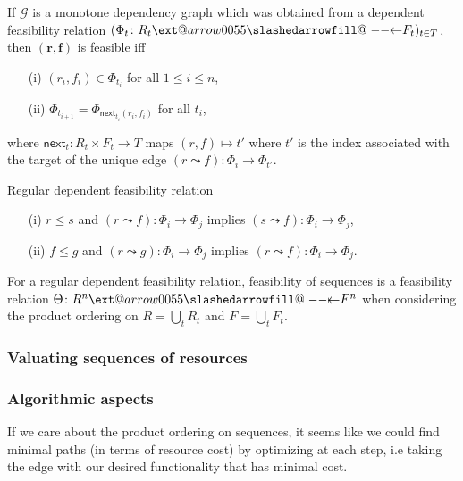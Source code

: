 \documentclass[12pt, a4paper]{article}
\makeatletter
\theoremstyle{definition}
\theoremstyle{plain}
\theoremstyle{plain}
\theoremstyle{plain}
\theoremstyle{plain}
\theoremstyle{plain}
\theoremstyle{remark}
\theoremstyle{remark}
\newcommand{\mc}[1]{\mathcal{#1}}
\def\slashedarrowfill@#1#2#3#4#5{%
	$\m@th\thickmuskip0mu\medmuskip\thickmuskip\thinmuskip\thickmuskip
	\relax#5#1\mkern-7mu%
	\cleaders\hbox{$#5\mkern-2mu#2\mkern-2mu$}\hfill
	\mathclap{#3}\mathclap{#2}%
	\cleaders\hbox{$#5\mkern-2mu#2\mkern-2mu$}\hfill
	\mkern-7mu#4$%
}
\def\leftslashedarrowfill@{%
	\slashedarrowfill@\relbar\relbar\mapstochar\leftarrow}
\newcommand\xslashedleftarrow[2][]{%
	\ext@arrow 0055{\leftslashedarrowfill@}{#1}{#2}}
\newcommand{\bprof}{\xslashedleftarrow{}}
\makeatother
\begin{document}
\begin{tctheorem}{}{}
If $\mc{G}$ is a monotone dependency graph which was obtained from a dependent feasibility relation $(\Phi_t \colon R_t \bprof F_t)_{t \in T}$, then $(\mathbf{r},\mathbf{f})$ is feasible iff
\begin{itemize}
	\item[(i)] $(r_i, f_i) \in \Phi_{t_i}$ for all $1 \leq i \leq n$,
	\item[(ii)] $\Phi_{t_{i+1}} = \Phi_{\mathsf{next}_{t_i}(r_i, f_i)}$ for all $t_i$,
\end{itemize}
where $\mathsf{next}_t : R_t \times F_t \rightarrow T$ maps $(r, f) \mapsto t'$ where $t'$ is the index associated with the target of the unique edge $(r \leadsto f) \colon \Phi_i \rightarrow \Phi_{t'}$.
\end{tctheorem}

\begin{tcdefinition}{Regular dependent feasibility relation}{}
	\begin{itemize}
		\item[(i)] $r \leq s$ and $(r \leadsto f) \colon \Phi_i \rightarrow \Phi_j$ implies $(s \leadsto f) \colon \Phi_i \rightarrow \Phi_j$,
		\item[(ii)] $f \leq g$ and $(r \leadsto g) \colon \Phi_i \rightarrow \Phi_j$ implies $(r \leadsto f) \colon \Phi_i \rightarrow \Phi_j$.
	\end{itemize}
\end{tcdefinition}

\begin{tctheorem}{}{}
	For a regular dependent feasibility relation, feasibility of sequences is a feasibility relation $\Theta \colon R^n \bprof F^n$ when considering the product ordering on $R = \bigcup_t R_t$ and $F = \bigcup_t F_t$.
\end{tctheorem}

\subsubsection{Valuating sequences of resources}

\subsubsection{Algorithmic aspects}
If we care about the product ordering on sequences, it seems like we could find minimal paths (in terms of resource cost) by optimizing at each step, i.e taking the edge with our desired functionality that has minimal cost.
\end{document}
